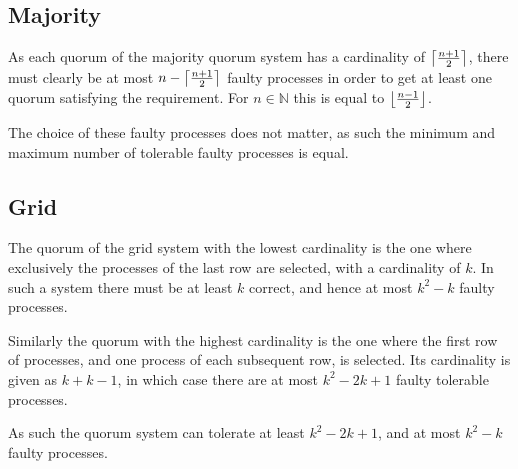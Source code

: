 \documentclass[a4paper]{scrreprt}
\DeclarePairedDelimiter{\ceil}{\lceil}{\rceil}
\DeclarePairedDelimiter{\floor}{\lfloor}{\rfloor}
\begin{document}
\subsection{Majority}

As each quorum of the majority quorum system has a cardinality of
$\ceil*{\frac{n + 1}{2}}$, there must clearly be at most $n - \ceil*{\frac{n +
1}{2}}$ faulty processes in order to get at least one quorum satisfying the
requirement. For $n \in \mathbb{N}$ this is equal to $\floor*{\frac{n -
1}{2}}$.

The choice of these faulty processes does not matter, as such the minimum and
maximum number of tolerable faulty processes is equal.

\subsection{Grid}

The quorum of the grid system with the lowest cardinality is the one where
exclusively the processes of the last row are selected, with a cardinality of
$k$. In such a system there must be at least $k$ correct, and hence at most
$k^2 - k$ faulty processes.

Similarly the quorum with the highest cardinality is the one where the first
row of processes, and one process of each subsequent row, is selected. Its
cardinality is given as $k + k - 1$, in which case there are at most $k^2 - 2k
+ 1$ faulty tolerable processes.

As such the quorum system can tolerate at least $k^2 - 2k + 1$, and at most
$k^2 - k$ faulty processes.
\end{document}
